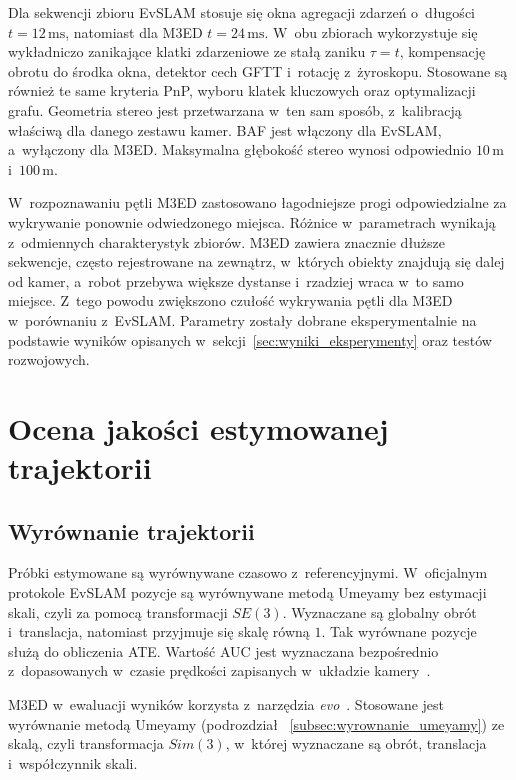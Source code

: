Dla sekwencji zbioru EvSLAM stosuje się okna agregacji zdarzeń o~długości $t=12\,\mathrm{ms}$, natomiast dla M3ED $t=24\,\mathrm{ms}$. W~obu zbiorach wykorzystuje się wykładniczo zanikające klatki zdarzeniowe ze stałą zaniku $\tau=t$, kompensację obrotu do środka okna, detektor cech GFTT i~rotację z~żyroskopu. Stosowane są również te same kryteria PnP, wyboru klatek kluczowych oraz optymalizacji grafu. Geometria stereo jest przetwarzana w~ten sam sposób, z~kalibracją właściwą dla danego zestawu kamer. BAF jest włączony dla EvSLAM, a~wyłączony dla M3ED. Maksymalna głębokość stereo wynosi odpowiednio $10\,\mathrm{m}$ i~$100\,\mathrm{m}$.

W~rozpoznawaniu pętli M3ED zastosowano łagodniejsze progi odpowiedzialne za wykrywanie ponownie odwiedzonego miejsca.
Różnice w~parametrach wynikają z~odmiennych charakterystyk zbiorów. M3ED zawiera znacznie dłuższe sekwencje, często rejestrowane na zewnątrz, w~których obiekty znajdują się dalej od kamer, a~robot przebywa większe dystanse i~rzadziej wraca w~to samo miejsce. Z~tego powodu zwiększono czułość wykrywania pętli dla M3ED w~porównaniu z~EvSLAM.
Parametry zostały dobrane eksperymentalnie na podstawie wyników opisanych w~sekcji~\ref{sec:wyniki_eksperymenty} oraz testów rozwojowych.

\section{Ocena jakości estymowanej trajektorii}
\label{sec:protokol_oceny}

\subsection{Wyrównanie trajektorii}
\label{subsec:wyrownanie}

Próbki estymowane są wyrównywane czasowo z~referencyjnymi. W~oficjalnym protokole EvSLAM pozycje są wyrównywane metodą Umeyamy bez estymacji skali, czyli za pomocą transformacji $SE(3)$. Wyznaczane są globalny obrót i~translacja, natomiast przyjmuje się skalę równą $1$. Tak wyrównane pozycje służą do obliczenia ATE. Wartość AUC jest wyznaczana bezpośrednio z~dopasowanych w~czasie prędkości zapisanych w~układzie kamery~\cite{evslam2026evaluation,zhong2026evslam}.

M3ED w~ewaluacji wyników korzysta z~narzędzia \textit{evo}~\cite{evo2025alignment}. Stosowane jest wyrównanie metodą Umeyamy (podrozdział ~\ref{subsec:wyrownanie_umeyamy}) ze skalą, czyli transformacja $Sim(3)$, w~której wyznaczane są obrót, translacja i~współczynnik skali.

